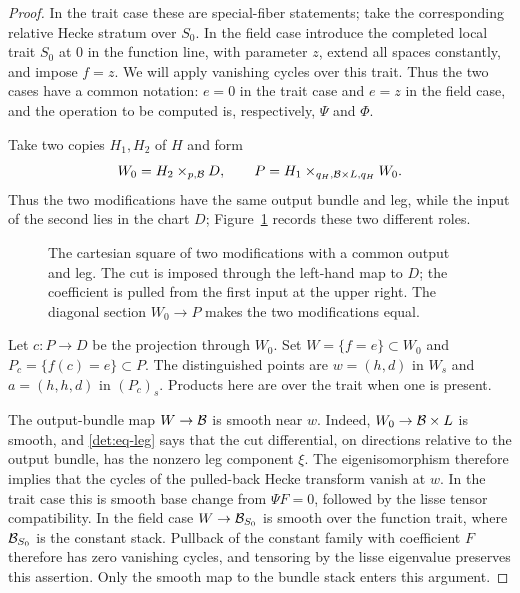 \begin{proof}
In the trait case these are special-fiber statements; take the
corresponding relative Hecke stratum over $S_0$.  In the field case introduce
the completed local trait $S_0$ at $0$ in the function line, with
parameter $z$, extend all spaces
constantly, and impose $f=z$.  We will apply vanishing cycles over this
trait.  Thus the two cases have a common notation: $e=0$ in the trait
case and $e=z$ in the field case, and the operation to be computed is,
respectively, $\Psi$ and $\Phi$.

Take two copies $H_1,H_2$ of $H$ and form
\begin{equation}\label{det:eq-double}
 W_0=H_2\times_{p,\mathcal B}D,
 \qquad
 P=H_1\times_{q_H,\mathcal B\times L,q_H}W_0.
\end{equation}
Thus the two modifications have the same output bundle and leg, while
the input of the second lies in the chart $D$; Figure~\ref{det:figure}
records these two different roles.

\begin{figure}[htbp]
\centering
{}
\caption{The cartesian square of two modifications with a common output
and leg. The cut is imposed through the left-hand map to $D$; the
coefficient is pulled from the first input at the upper right.
The diagonal section $W_0\to P$ makes the two modifications equal.}
\label{det:figure}
\end{figure}

Let $c:P\to D$ be the projection through $W_0$.  Set
$W=\{f=e\}\subset W_0$ and $P_c=\{f(c)=e\}\subset P$.
The distinguished points are $w=(h,d)$ in $W_s$ and
$a=(h,h,d)$ in $(P_c)_s$.  Products here are over the trait when one is
present.

The output-bundle map $W\to\mathcal B$ is smooth near $w$.  Indeed,
$W_0\to\mathcal B\times L$ is smooth, and
\eqref{det:eq-leg} says that the cut differential, on directions
relative to the output bundle, has the nonzero leg component $\xi$.
The eigenisomorphism therefore implies that the cycles of the pulled-back
Hecke transform vanish at $w$.  In the trait case this is smooth base
change from $\Psi F=0$, followed by the lisse tensor compatibility.  In
the field case $W\to\mathcal B_{S_0}$ is smooth over the function trait, where
$\mathcal B_{S_0}$ is the constant stack.  Pullback of the constant family with
coefficient $F$ therefore has zero vanishing cycles, and tensoring by
the lisse eigenvalue preserves this assertion.  Only the smooth map to the bundle stack enters this argument.


\end{proof}
